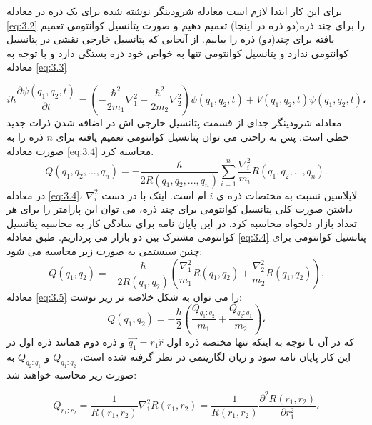 \documentclass[a4paper,titlepage,12pt,fleqn,oneside]{report}
\begin{document}
	برای این کار ابتدا لازم است معادله شرودینگر نوشته شده برای یک ذره در معادله 
	\ref{eq:3.2}
	را برای چند ذره(دو ذره در اینجا) تعمیم دهیم و صورت پتانسیل کوانتومی تعمیم یافته برای چند(دو) ذره را بیابیم. از آنجایی که پتانسیل خارجی نقشی در پتانسیل کوانتومی ندارد و پتانسیل کوانتومی تنها به خواص خود ذره بستگی دارد و با توجه به معادله 
	\ref{eq:3.3}
	
	\begin{equation}
		i \hbar \frac{\partial\psi(q_1,q_2,t)}{\partial t} =\left(-\frac{\hbar^2}{2m_1}{\nabla_1^2}-\frac{\hbar^2}{2m_2}{\nabla_2^2} \right)\psi(q_1,q_2,t)+V(q_1,q_2,t)\psi(q_1,q_2,t) ،
		\label{eq:3.3}
	\end{equation}
	معادله شرودینگر جدای از قسمت پتانسیل خارجی اش در اضافه شدن ذرات جدید خطی است. پس به راحتی می توان پتانسیل کوانتومی تعمیم یافته برای $n$ ذره را به صورت معادله
	\ref{eq:3.4}
	محاسبه کرد.
	\begin{equation}
		Q(q_{1},q_{2},...,q_{n})=-\frac{\hbar}{2R(q_{1},q_{2},...,q_{n})}\sum
		_{i=1}^{n}\frac{\nabla_i^2}{m_{i}}R(q_{1}
		,q_{2},...,q_{n}).
		\label{eq:3.4}
	\end{equation}
	در معادله 
	\ref{eq:3.4}،
	$\nabla_i^2$
	لاپلاسین نسبت به مختصات ذره ی $i$ ام است.
	اینک با در دست داشتن صورت کلی پتانسیل کوانتومی برای چند ذره، می توان این پارامتر را برای هر تعداد بازار دلخواه محاسبه کرد. در این پایان نامه برای سادگی کار به محاسبه پتانسیل کوانتومی مشترک بین دو بازار می پردازیم. طبق معادله
	\ref{eq:3.4}
	پتانسیل کوانتومی برای چنین سیستمی به صورت زیر محاسبه می شود:
	\begin{equation}
		Q(q_{1},q_{2})=-\frac{\hbar}{2R(q_{1},q_{2})}\left(\frac{\nabla_1^2}{m_{1}}R(q_{1}
		,q_{2}) + \frac{\nabla_2^2}{m_{2}}R(q_{1},q_{2})\right).
		\label{eq:3.5}
	\end{equation}
	معادله
	\ref{eq:3.5}
	را می توان به شکل خلاصه تر زیر نوشت:
	\begin{equation}
		Q(q_{1},q_{2})=-\frac{\hbar}{2}\left(\frac{Q_{q_1:q_2}}{m_{1}} + \frac{Q_{q_2:q_1}}{m_{2}}\right)،
		\label{eq:3.6}
	\end{equation}
	که در آن با توجه به اینکه تنها مختصه ذره اول
	$\vec{q_1} = r_1\hat{r}$ 
	و ذره دوم همانند ذره اول در این کار پایان نامه سود و زیان لگاریتمی در نظر گرفته شده است، 
	$Q_{q_1:q_2}$
	و
	$Q_{q_2:q_1}$
	به صورت زیر محاسبه خواهند شد:
	
	\begin{equation}
		Q_{r_1:r_2} =\frac{1}{R(r_1,r_2)} \nabla_1^2 R(r_{1},r_{2} ) =\frac{1}{R(r_1,r_2)} \frac{\partial^2 R(r_1,r_2)}{\partial r_1^2}،
		\label{eq:3.7}
	\end{equation}
	
\end{document}
